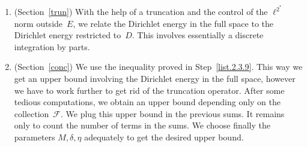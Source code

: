\documentclass[10pt]{amsart}
\theoremstyle{definition}\newtheorem{defi}[theo]{Definition}\newtheorem{rema}[theo]{Remark}\newtheorem{exam}[theo]{Example}\newtheorem{exem}[theo]{Example}\newtheorem{nota}[theo]{Notation}
\newcommand{\cF}{\mathcal{F}}
\begin{document}
\begin{enumerate}
\item \label{list.2.3.8}(Section~\ref{trun}) With the help of a truncation and the control of the $\ell^{2^*}$ norm outside~$E$, we relate the Dirichlet energy in the full space to the Dirichlet energy restricted to~$D$. This involves essentially a discrete integration by parts.

\item \label{list.2.3.9}(Section~\ref{conc}) We use the inequality proved in Step~\eqref{list.2.3.9}. This way we get an upper bound involving the Dirichlet energy in the full space, however we have to work further to get rid of the truncation operator. After some tedious computations, we obtain an upper bound depending only on the collection~$\cF$. We plug this upper bound in the previous sums. It remains only to count the number of terms in the sums. We choose finally the parameters $M,\delta,\eta$ adequately to get the desired upper bound.
\end{enumerate}
\end{document}
